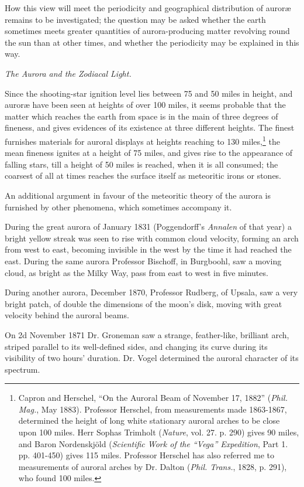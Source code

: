 \documentclass[a4paper, 12pt, oneside, polutonikogreek, english]{article}
\begin{document}
How this view will meet the periodicity and geographical distribution of auroræ remains to be investigated; the question may be asked whether the earth sometimes meets greater quantities of aurora-producing matter revolving round the sun than at other times, and whether the periodicity may be explained in this way.

\emph{The Aurora and the Zodiacal Light.}

Since the shooting-star ignition level lies between 75 and 50 miles in height, and auroræ have been seen at heights of over 100 miles, it seems probable that the matter which reaches the earth from space is in the main of three degrees of fineness, and gives evidences of its existence at three different heights. The finest furnishes materials for auroral displays at heights reaching to 130 miles,\footnote{Capron and Herschel, ``On the Auroral Beam of November 17, 1882'' (\emph{Phil. Mag.}, May 1883). Professor Herschel, from measurements made 1863-1867, determined the height of long white stationary auroral arches to be close upon 100 miles. Herr Sophas Trimholt (\emph{Nature}, vol. 27. p. 290) gives 90 miles, and Baron Nordenskjöld (\emph{Scientific Work of the ``Vega'' Expedition}, Part 1. pp. 401-450) gives 115 miles. Professor Herschel has also referred me to measurements of auroral arches by Dr. Dalton (\emph{Phil. Trans.}, 1828, p. 291), who found 100 miles.} the mean fineness ignites at a height of 75 miles, and gives rise to the appearance of falling stars, till a height of 50 miles is reached, when it is all consumed; the coarsest of all at times reaches the surface itself as meteoritic irons or stones.

An additional argument in favour of the meteoritic theory of the aurora is furnished by other phenomena, which sometimes accompany it.

During the great aurora of January 1831 (Poggendorff's \emph{Annalen} of that year) a bright yellow streak was seen to rise with common cloud velocity, forming an arch from west to east, becoming invisible in the west by the time it had reached the east. During the same aurora Professor Bischoff, in Burgboohl, saw a moving cloud, as bright as the Milky Way, pass from east to west in five minutes.

During another aurora, December 1870, Professor Rudberg, of Upsala, saw a very bright patch, of double the dimensions of the moon's disk, moving with great velocity behind the auroral beams.

On 2d November 1871 Dr. Groneman saw a strange, feather-like, brilliant arch, striped parallel to its well-defined sides, and changing its curve during its visibility of two hours' duration. Dr. Vogel determined the auroral character of its spectrum.
\end{document}
